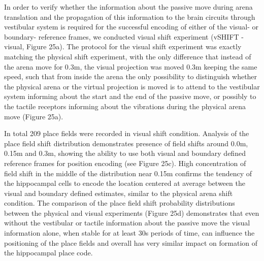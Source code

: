 In order to verify whether the information about the passive move during arena translation and the propagation of this information to the brain circuits through vestibular system is required for the successful encoding of either of the visual- or boundary- reference frames, we conducted visual shift experiment (vSHIFT - visual, Figure 25a). The protocol for the visual shift experiment was exactly matching the physical shift experiment, with the only difference that instead of the arena move for 0.3m, the visual projection was moved 0.3m keeping the same speed, such that from inside the arena the only possibility to distinguish whether the physical arena or the virtual projection is moved is to attend to the vestibular system informing about the start and the end of the passive move, or possibly to the tactile receptors informing about the vibrations during the physical arena move (Figure 25a).

In total 209 place fields were recorded in visual shift condition. Analysis of the place field shift distribution demonstrates presence of field shifts around 0.0m, 0.15m and 0.3m, showing the ability to use both visual and boundary defined reference frames for position encoding (see Figure 25c). High concentration of field shift in the middle of the distribution near 0.15m confirms the tendency of the hippocampal cells to encode the location centered at average between the visual and boundary defined estimates, similar to the physical arena shift condition. The comparison of the place field shift probability distributions between the physical and visual experiments (Figure 25d) demonstrates that even without the vestibular or tactile information about the passive move the visual information alone, when stable for at least 30s periods of time, can influence the positioning of the place fields and overall has very similar impact on formation of the hippocampal place code.

